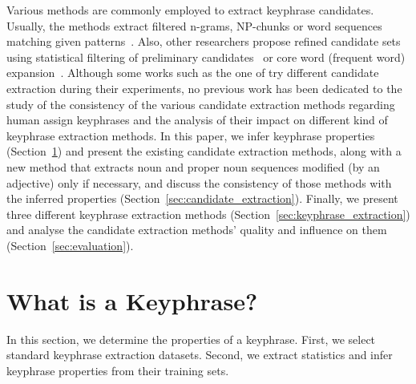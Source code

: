   Various methods are commonly employed to extract keyphrase candidates.
  Usually, the methods extract filtered n-grams, NP-chunks or word sequences
  matching given patterns~\cite{hulth2003keywordextraction}. Also, other
  researchers propose refined candidate sets using statistical filtering of
  preliminary candidates~\cite{kim2009reexaminingautomatickeyphraseextraction}
  or core word (frequent word) expansion~\cite{you2009refinedcandidateset}.
%
  Although some works such as the one of  try
  different candidate extraction during their experiments, no previous work has
  been dedicated to the study of the consistency of the various candidate
  extraction methods regarding human assign keyphrases and the analysis of their
  impact on different kind of keyphrase extraction methods.
  In this paper, we infer keyphrase properties
  (Section~\ref{sec:definition_of_candidate_keyphrases}) and present the
  existing candidate extraction methods, along with a new method that extracts
  noun and proper noun sequences modified (by an adjective) only if necessary,
  and discuss the consistency of those methods with the inferred properties
  (Section~\ref{sec:candidate_extraction}). Finally, we present three different
  keyphrase extraction methods (Section~\ref{sec:keyphrase_extraction}) and
  analyse the candidate extraction methods' quality and influence on them
  (Section~\ref{sec:evaluation}).


\section{What is a Keyphrase?}
\label{sec:definition_of_candidate_keyphrases}
  In this section, we determine the properties of a keyphrase. First, we select
  standard keyphrase extraction datasets. Second, we extract statistics and
  infer keyphrase properties from their training sets.


